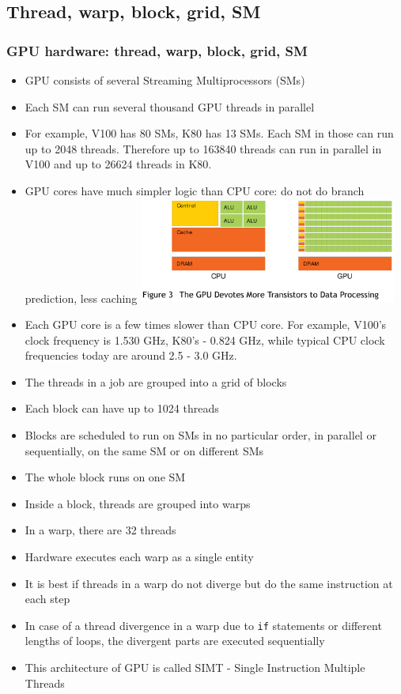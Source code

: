 \subsection{Thread, warp, block, grid, SM}
\begin{frame}[fragile]
  \frametitle{GPU hardware: thread, warp, block, grid, SM}
\begin{itemize}
\item GPU consists of several {\color{mycolordef}Streaming Multiprocessors (SMs)}
\item Each SM can run several thousand GPU {\color{mycolordef}threads} in parallel
\item For example, V100 has 80 SMs, K80 has 13 SMs. Each SM in those can run up to 2048 threads. Therefore up to 163840 threads can run in parallel in V100 and up to 26624 threads in K80.
\item GPU cores have much simpler logic than CPU core: do not do branch prediction, less caching
\includegraphics[width=8.5cm]{graphs/gpu_vs_cpu.png}
\end{itemize}
\end{frame}


\begin{frame}[fragile]
\begin{itemize}
\item Each GPU core is a few times slower than CPU core. For example, V100's clock frequency is 1.530 GHz, K80's - 0.824 GHz, while typical CPU clock frequencies today are around 2.5 - 3.0 GHz.
\item The threads in a job are grouped into a {\color{mycolordef}grid of blocks}
\item Each block can have up to 1024 threads
\item Blocks are scheduled to run on SMs in no particular order, in parallel  or sequentially, on the same SM or on different SMs
\item The whole block runs on one SM
\item Inside a block, threads are grouped into {\color{mycolordef}warps}
\item In a warp, there are 32 threads
\item Hardware executes each warp as a single entity
\item It is best if threads in a warp do not diverge but do the same instruction at each step
\item In case of a thread divergence in a warp due to {\color{mycolorcode}\verb|if|} statements or different lengths of loops, the divergent parts are executed sequentially
\item This architecture of GPU is called {\color{mycolordef}SIMT - Single Instruction Multiple Threads}
\end{itemize}
\end{frame}

